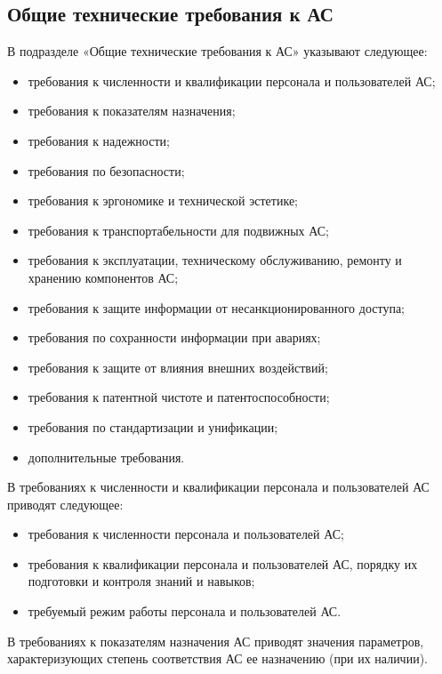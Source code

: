 {\subsection{Общие технические требования к АС}
В подразделе «Общие технические требования к АС» указывают следующее:
\begin{itemize}
  \item требования к численности и квалификации персонала и пользователей АС;
  \item требования к показателям назначения;
  \item требования к надежности;
  \item требования по безопасности;
  \item требования к эргономике и технической эстетике;
  \item требования к транспортабельности для подвижных АС;
  \item требования к эксплуатации, техническому обслуживанию, ремонту и хранению компонентов АС;
  \item требования к защите информации от несанкционированного доступа;
  \item требования по сохранности информации при авариях;
  \item требования к защите от влияния внешних воздействий;
  \item требования к патентной чистоте и патентоспособности;
  \item требования по стандартизации и унификации;
  \item дополнительные требования.
\end{itemize}
В требованиях к численности и квалификации персонала и пользователей АС приводят следующее:
\begin{itemize}
  \item требования к численности персонала и пользователей АС;
  \item требования к квалификации персонала и пользователей АС, порядку их подготовки и контроля знаний и навыков;
  \item требуемый режим работы персонала и пользователей АС.
\end{itemize}
В требованиях к показателям назначения АС приводят значения параметров, характеризующих степень соответствия АС ее назначению (при их наличии).

}
